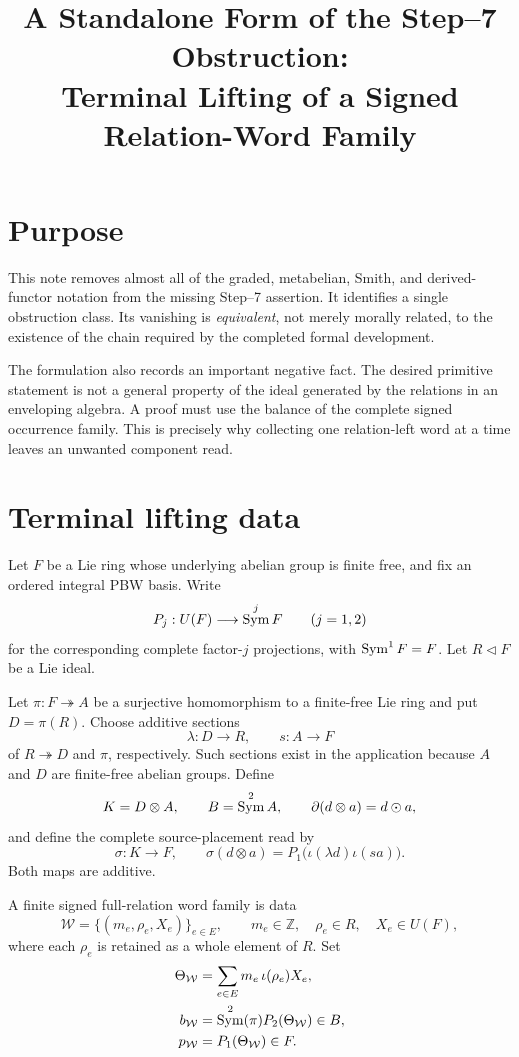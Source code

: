 \documentclass[11pt]{article}
\title{A Standalone Form of the Step--7 Obstruction:\\
  Terminal Lifting of a Signed Relation-Word Family}
\author{}
\date{}
\newcommand{\Z}{\mathbb Z}
\newcommand{\Sym}{\mathop{\rm Sym}}
\begin{document}
\maketitle

\section{Purpose}

This note removes almost all of the graded, metabelian, Smith, and
derived-functor notation from the missing Step--7 assertion.  It identifies a
single obstruction class.  Its vanishing is \emph{equivalent}, not merely
morally related, to the existence of the chain required by the completed
formal development.

The formulation also records an important negative fact.  The desired
primitive statement is not a general property of the ideal generated by the
relations in an enveloping algebra.  A proof must use the balance of the
complete signed occurrence family.  This is precisely why collecting one
relation-left word at a time leaves an unwanted component read.

\section{Terminal lifting data}

Let $F$ be a Lie ring whose underlying abelian group is finite free, and fix
an ordered integral PBW basis.  Write
\[
       P_j:U(F)\longrightarrow\Sym^jF
       \qquad (j=1,2)
\]
for the corresponding complete factor-$j$ projections, with
$\Sym^1F=F$.  Let $R\triangleleft F$ be a Lie ideal.

Let $\pi:F\twoheadrightarrow A$ be a surjective homomorphism to a
finite-free Lie ring and put $D=\pi(R)$.  Choose additive sections
\[
       \lambda:D\longrightarrow R,
       \qquad s:A\longrightarrow F
\]
of $R\twoheadrightarrow D$ and $\pi$, respectively.  Such sections exist in
the application because $A$ and $D$ are finite-free abelian groups.  Define
\[
 K=D\otimes A,
 \qquad B=\Sym^2A,
 \qquad
 \partial(d\otimes a)=d\odot a,
\]
and define the complete source-placement read by
\[
 \sigma:K\longrightarrow F,
 \qquad
 \sigma(d\otimes a)
   =P_1\bigl(\iota(\lambda d)\iota(sa)\bigr).
\]
Both maps are additive.

A finite signed full-relation word family is data
\[
       \mathcal W=\{(m_e,\rho_e,X_e)\}_{e\in E},
       \qquad
       m_e\in\Z,\quad \rho_e\in R,\quad X_e\in U(F),
\]
where each $\rho_e$ is retained as a whole element of $R$.  Set
\begin{align*}
 \Theta_{\mathcal W}&=\sum_{e\in E}m_e\,\iota(\rho_e)X_e,\\
 b_{\mathcal W}&=\Sym^2(\pi)P_2(\Theta_{\mathcal W})\in B,\\
 p_{\mathcal W}&=P_1(\Theta_{\mathcal W})\in F.
\end{align*}
\end{document}
